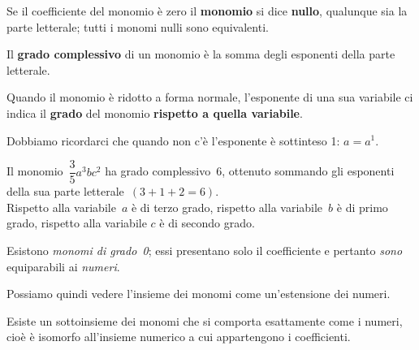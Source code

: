 \begin{definizione}{}{}
Se il coefficiente del monomio è zero il \textbf{monomio} si dice
\textbf{nullo}, qualunque sia la parte
letterale; tutti i monomi nulli sono equivalenti.
\end{definizione}


\begin{definizione}{}{}
Il \textbf{grado complessivo} di un monomio è la somma degli esponenti della parte letterale.

Quando il monomio è ridotto a forma normale, l'esponente di una sua 
variabile ci indica il
\textbf{grado} del monomio \textbf{rispetto a quella variabile}.
\end{definizione}

Dobbiamo ricordarci che quando non c'è l'esponente è sottinteso 1: \quad 
\(a = a^1\).

\begin{esempio}{}{}
Il monomio~\(\dfrac{3}{5}a^{3}bc^{2}\) ha grado complessivo~6,
ottenuto sommando gli esponenti della sua parte letterale~\((3+1+2=6)\).\\
Rispetto alla variabile~\(a\) è di terzo grado, rispetto alla
variabile~\(b\) è di primo grado, rispetto alla variabile
\(c\) è di secondo grado.
\end{esempio}

% 


\begin{osservazione}{}{} 
Esistono \emph{monomi di grado~0}; essi presentano solo il
coefficiente e pertanto \emph{sono} equiparabili ai \emph{numeri}.

Possiamo quindi vedere l'insieme dei monomi come un'estensione dei numeri.

Esiste un sottoinsieme dei monomi che si comporta esattamente come i 
numeri, cioè è isomorfo all'insieme numerico a cui appartengono i 
coefficienti.
\end{osservazione}

